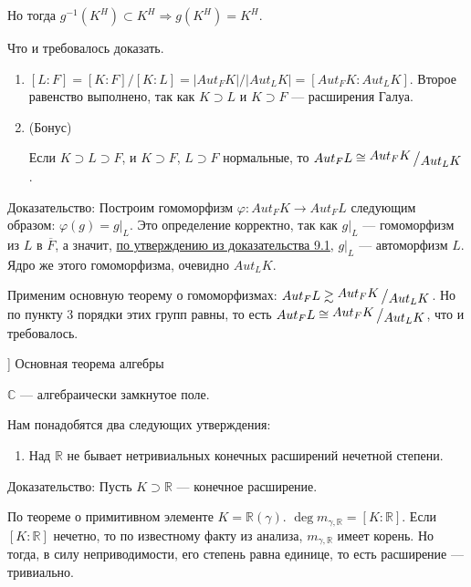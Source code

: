 Но тогда \(g^{-1}(K^H) \subset K^H \Rightarrow g(K^H) = K^H\).

Что и требовалось доказать.

\begin{enumerate}
\def\labelenumi{\arabic{enumi})}
\setcounter{enumi}{2}
\item
  \([L : F] = [K : F] / [K : L] = |Aut_FK| / |Aut_LK| = [Aut_FK : Aut_LK]\). Второе равенство выполнено, так как \(K \supset L\) и \(K \supset F\) --- расширения Галуа.
\item
  \hypertarget{9.4.bonus}{(Бонус)}
  Если \(K \supset L \supset F\), и \(K \supset F\), \(L \supset F\) нормальные, то \(Aut_FL \cong \bigslant{Aut_FK}{Aut_LK}\).
\end{enumerate}

Доказательство: Построим гомоморфизм \(\varphi: Aut_FK \to Aut_FL\) следующим образом: \(\varphi(g) = g|_L\). Это определение корректно, так как \(g|_L\) --- гомоморфизм из \(L\) в \(\overline{F}\), а значит, \hyperlink{9.1.statement.2}{по утверждению из доказательства 9.1}, \(g|_L\) --- автоморфизм \(L\). Ядро же этого гомоморфизма, очевидно \(Aut_LK\).

Применим основную теорему о гомоморфизмах:
\(Aut_FL \gtrsim \bigslant{Aut_FK}{Aut_LK}\). Но по пункту 3 порядки этих групп равны, то есть \(Aut_FL \cong \bigslant{Aut_FK}{Aut_LK}\), что и требовалось.

\begin{problem}[10 [Каргальцев]]
Основная теорема алгебры

$\mathbb{C}$ --- алгебраически замкнутое поле.
\end{problem}

Нам понадобятся два следующих утверждения:

\begin{enumerate}
\def\labelenumi{\arabic{enumi})}
\tightlist
\item
  Над \(\mathbb{R}\) не бывает нетривиальных конечных расширений нечетной степени.
\end{enumerate}

Доказательство: Пусть \(K \supset \mathbb{R}\) --- конечное расширение.

По теореме о примитивном элементе \(K = \mathbb{R}(\gamma)\). \(\deg m_{\gamma, \mathbb{R}} = [K : \mathbb{R}]\). Если \([K : \mathbb{R}]\) нечетно, то по известному факту из анализа, \(m_{\gamma, \mathbb{R}}\) имеет корень. Но тогда, в силу неприводимости, его степень равна единице, то есть расширение --- тривиально.

